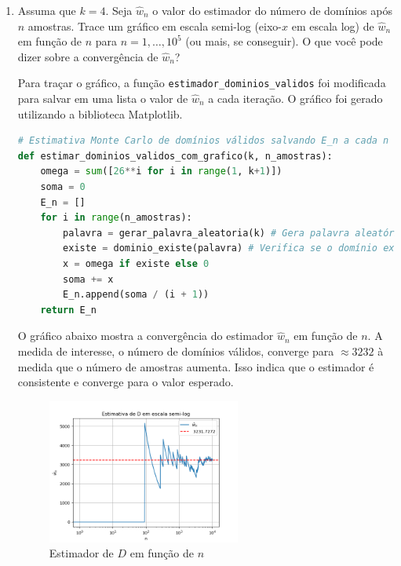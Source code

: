 \documentclass[12 pt]{article}
\begin{document}
\begin{enumerate}
\begin{tcolorbox}[colframe=black, title=Resposta:]
    \end{tcolorbox}
    \item Assuma que $k = 4$. Seja $\hat{w}_n$ o valor do estimador do número de domínios após $n$ amostras. Trace um gráfico em escala semi-log (eixo-$x$ em escala log) de $\hat{w}_n$ em função de $n$ para $n = 1, \dots, 10^5$ (ou mais, se conseguir). O que você pode dizer sobre a convergência de $\hat{w}_n$?
    \begin{tcolorbox}[colframe=black, title=Resposta:]
        Para traçar o gráfico, a função \texttt{estimador\_dominios\_validos} foi modificada para salvar em uma lista o valor de $\hat{w}_n$ a cada iteração. O gráfico foi gerado utilizando a biblioteca Matplotlib.
        \begin{lstlisting}[language=Python]
# Estimativa Monte Carlo de domínios válidos salvando E_n a cada n
def estimar_dominios_validos_com_grafico(k, n_amostras):
    omega = sum([26**i for i in range(1, k+1)])
    soma = 0
    E_n = []
    for i in range(n_amostras):
        palavra = gerar_palavra_aleatoria(k) # Gera palavra aleatória de tamanho k
        existe = dominio_existe(palavra) # Verifica se o domínio existe
        x = omega if existe else 0
        soma += x
        E_n.append(soma / (i + 1))
    return E_n
        \end{lstlisting}

        O gráfico abaixo mostra a convergência do estimador $\hat{w}_n$ em função de $n$. A medida de interesse, o número de domínios válidos, converge para $\approx 3232$ à medida que o número de amostras aumenta. Isso indica que o estimador é consistente e converge para o valor esperado. 

    \end{tcolorbox}
    \begin{figure}[H]
        \centering
        \includegraphics[width=0.6\textwidth]{q7_3.png}
        \caption{Estimador de $D$ em função de $n$}
        \label{fig:estimador_D}
    \end{figure}
\end{enumerate}
\end{document}
